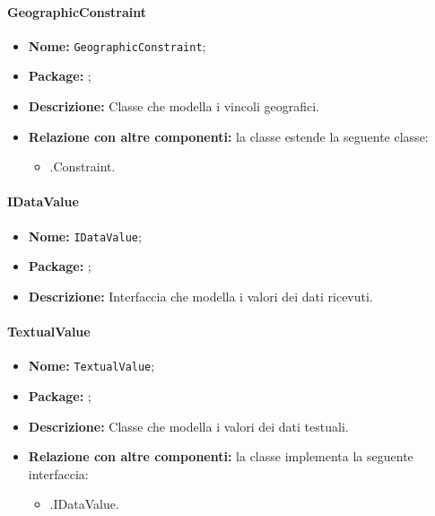 \paragraph{GeographicConstraint}
\begin{itemize}
\item \textbf{Nome:} \texttt{GeographicConstraint};
\item \textbf{Package:} \texttt{\smodel{}};
\item \textbf{Descrizione:} Classe che modella i vincoli geografici.
\item \textbf{Relazione con altre componenti:} la classe estende la seguente classe:
		\begin{itemize}
			\item \smodel{}.Constraint.
		\end{itemize}
\end{itemize}

\paragraph{IDataValue}
\begin{itemize}
\item \textbf{Nome:} \texttt{IDataValue};
\item \textbf{Package:} \texttt{\smodel{}};
\item \textbf{Descrizione:} Interfaccia che modella i valori dei dati ricevuti.
\end{itemize}

\paragraph{TextualValue}
\begin{itemize}
\item \textbf{Nome:} \texttt{TextualValue};
\item \textbf{Package:} \texttt{\smodel{}};
\item \textbf{Descrizione:} Classe che modella i valori dei dati testuali.
\item \textbf{Relazione con altre componenti:} la classe implementa la seguente interfaccia:
		\begin{itemize}
			\item \smodel{}.IDataValue.
		\end{itemize}
\end{itemize}

